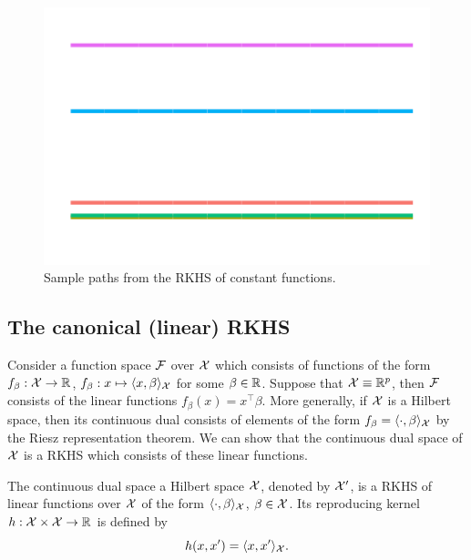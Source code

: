 \begin{figure}[hbt]
  \centering
  \includegraphics[scale=0.5]{figure/kernel_path_const_th}
  \caption{Sample paths from the RKHS of constant functions.}
\end{figure}

\subsection{The canonical (linear) RKHS}

Consider a function space ${\mathcal F}$ over ${\mathcal X}$ which consists of functions of the form $f_\beta:{\mathcal X}\to\mathbb{R}$, $f_\beta: x \mapsto \langle x,\beta\rangle_{\mathcal X}$ for some $\beta\in\mathbb{R}$.
Suppose that ${\mathcal X} \equiv \mathbb{R}^p$, then ${\mathcal F}$ consists of the linear functions $f_\beta(x) = x^\top\beta$.
More generally, if ${\mathcal X}$ is a Hilbert space, then its continuous dual consists of elements of the form $f_\beta = \langle\cdot,\beta\rangle_{\mathcal X}$ by the Riesz representation theorem.
We can show that the continuous dual space of ${\mathcal X}$ is a RKHS which consists of these linear functions.

\begin{proposition}
  The continuous dual space a Hilbert space ${\mathcal X}$, denoted by ${\mathcal X}'$, is a RKHS of linear functions over ${\mathcal X}$ of the form $\langle\cdot,\beta\rangle_{\mathcal X}$, $\beta\in{\mathcal X}$. Its reproducing kernel $h:{\mathcal X}\times{\mathcal X}\to\mathbb{R}$ is defined by
  \[
    h(x,x') = \langle x,x'\rangle_{{\mathcal X}}.
  \]
\end{proposition}


